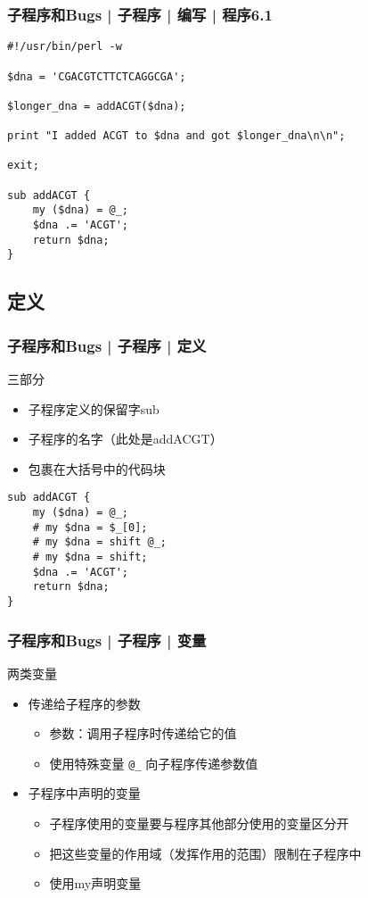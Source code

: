 \begin{frame}[fragile]
  \frametitle{子程序和Bugs | 子程序 | 编写 | \alert{程序6.1}}
  \vspace{-0.5em}
\begin{lstlisting}
#!/usr/bin/perl -w

$dna = 'CGACGTCTTCTCAGGCGA';

$longer_dna = addACGT($dna);

print "I added ACGT to $dna and got $longer_dna\n\n";

exit;

sub addACGT {
    my ($dna) = @_;
    $dna .= 'ACGT';
    return $dna;
}
\end{lstlisting}
\end{frame}

\subsection{定义}
\begin{frame}[fragile]
  \frametitle{子程序和Bugs | 子程序 | \alert{定义}}
  \begin{block}{三部分}
    \begin{itemize}
      \item 子程序定义的保留字sub
      \item 子程序的名字（此处是addACGT）
      \item 包裹在大括号中的代码块
    \end{itemize}
  \end{block}
\begin{lstlisting}
sub addACGT {
    my ($dna) = @_;
    # my $dna = $_[0];
    # my $dna = shift @_;
    # my $dna = shift;
    $dna .= 'ACGT';
    return $dna;
}
\end{lstlisting}
\end{frame}

\begin{frame}[fragile]
  \frametitle{子程序和Bugs | 子程序 | \alert{变量}}
  \begin{block}{两类变量}
    \begin{itemize}
      \item 传递给子程序的参数
	\begin{itemize}
	  \item 参数：调用子程序时传递给它的值
	  \item 使用特殊变量 \verb|@_| 向子程序传递参数值
	\end{itemize}
      \item 子程序中声明的变量
	\begin{itemize}
	  \item 子程序使用的变量要与程序其他部分使用的变量区分开
	  \item 把这些变量的作用域（发挥作用的范围）限制在子程序中
	  \item 使用my声明变量
	\end{itemize}
    \end{itemize}
  \end{block}
\end{frame}

